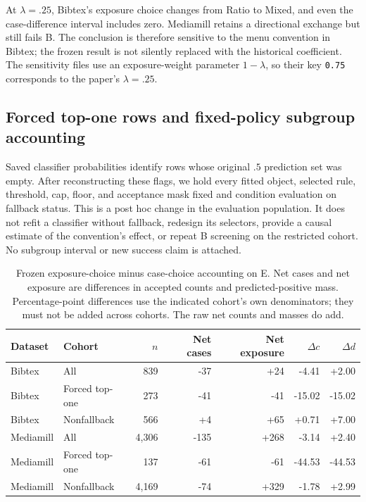At $\lambda=.25$, Bibtex's exposure choice changes from Ratio to Mixed, and even the case-difference interval includes zero. Mediamill retains a directional exchange but still fails B. The conclusion is therefore sensitive to the menu convention in Bibtex; the frozen result is not silently replaced with the historical coefficient. The sensitivity files use an exposure-weight parameter $1-\lambda$, so their key \texttt{0.75} corresponds to the paper's $\lambda=.25$.

\subsection{Forced top-one rows and fixed-policy subgroup accounting}
\label{sec:v13-fallback}
Saved classifier probabilities identify rows whose original $.5$ prediction set was empty. After reconstructing these flags, we hold every fitted object, selected rule, threshold, cap, floor, and acceptance mask fixed and condition evaluation on fallback status. This is a post hoc change in the evaluation population. It does not refit a classifier without fallback, redesign its selectors, provide a causal estimate of the convention's effect, or repeat B screening on the restricted cohort. No subgroup interval or new success claim is attached.

\begin{table}[H]\centering\small
\setlength{\tabcolsep}{4pt}
\caption{Frozen exposure-choice minus case-choice accounting on E. Net cases and net exposure are differences in accepted counts and predicted-positive mass. Percentage-point differences use the indicated cohort's own denominators; they must not be added across cohorts. The raw net counts and masses do add.}
\label{tab:v13-fallback}
\begin{tabular}{llrrrrr}\toprule
Dataset & Cohort & $n$ & Net cases & Net exposure & $\Delta c$ & $\Delta d$\\\midrule
Bibtex & All & 839 & -37 & +24 & -4.41 & +2.00 \\
Bibtex & Forced top-one & 273 & -41 & -41 & -15.02 & -15.02 \\
Bibtex & Nonfallback & 566 & +4 & +65 & +0.71 & +7.00 \\
\midrule
Mediamill & All & 4,306 & -135 & +268 & -3.14 & +2.40 \\
Mediamill & Forced top-one & 137 & -61 & -61 & -44.53 & -44.53 \\
Mediamill & Nonfallback & 4,169 & -74 & +329 & -1.78 & +2.99 \\
\bottomrule\end{tabular}
\end{table}

